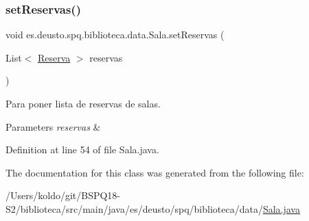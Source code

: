 \subsubsection{\texorpdfstring{set\+Reservas()}{setReservas()}}
{\footnotesize\ttfamily void es.\+deusto.\+spq.\+biblioteca.\+data.\+Sala.\+set\+Reservas (\begin{DoxyParamCaption}\item[{List$<$ \mbox{\hyperlink{classes_1_1deusto_1_1spq_1_1biblioteca_1_1data_1_1_reserva}{Reserva}} $>$}]{reservas }\end{DoxyParamCaption})}

Para poner lista de reservas de salas. 
\begin{DoxyParams}{Parameters}
{\em reservas} & \\
\hline
\end{DoxyParams}


Definition at line 54 of file Sala.\+java.



The documentation for this class was generated from the following file\+:\begin{DoxyCompactItemize}
\item 
/\+Users/koldo/git/\+B\+S\+P\+Q18-\/\+S2/biblioteca/src/main/java/es/deusto/spq/biblioteca/data/\mbox{\hyperlink{_sala_8java}{Sala.\+java}}\end{DoxyCompactItemize}
